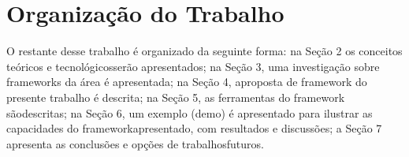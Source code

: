 \section{Organização do Trabalho}

O restante desse trabalho é organizado da seguinte forma: na Seção 2 os conceitos teóricos e tecnológicosserão apresentados; na Seção 3, uma investigação sobre frameworks da área é apresentada; na Seção 4, aproposta de framework do presente trabalho é descrita; na Seção 5, as ferramentas do framework sãodescritas; na Seção 6, um exemplo (demo) é apresentado para ilustrar as capacidades do frameworkapresentado, com resultados e discussões; a Seção 7 apresenta as conclusões e opções de trabalhosfuturos.